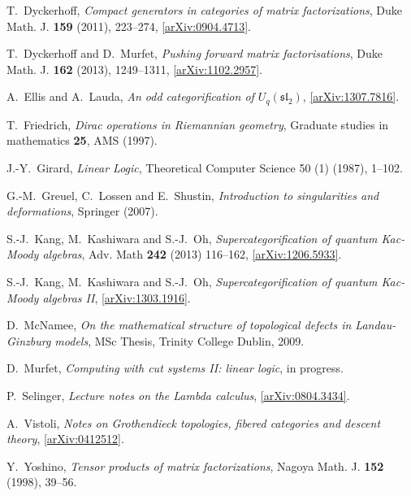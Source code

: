 \documentclass[english,letter paper,12pt,leqno]{article}
\theoremstyle{example}
\numberwithin{equation}{section}
\begin{document}
\begin{thebibliography}{BHLS03}
T.~Dyckerhoff, \textsl{Compact generators in categories of matrix factorizations},
  Duke Math. J. \textbf{159} (2011), 223--274,
  \href{http://arxiv.org/abs/0904.4713}{[arXiv:0904.4713]}.

T.~Dyckerhoff and D.~Murfet, \textsl{Pushing forward matrix factorisations}, Duke Math. J. \textbf{162} (2013), 1249--1311, \href{http://arxiv.org/abs/1102.2957}{[arXiv:1102.2957]}.

A.~Ellis and A.~Lauda, \textsl{An odd categorification of $U_q(\mathfrak{sl}_2)$}, \href{http://arxiv.org/abs/1307.7816}{[arXiv:1307.7816]}.

T.~Friedrich, \textsl{{D}irac operations in {R}iemannian geometry}, Graduate studies in mathematics \textbf{25}, AMS (1997).
  
J.-Y.~Girard, \textsl{Linear Logic}, Theoretical Computer Science 50 (1) (1987), 1--102.

G.-M.~Greuel, C.~Lossen and E.~Shustin, \textsl{Introduction to singularities and deformations}, Springer (2007).

S.-J.~Kang, M.~Kashiwara and S.-J.~Oh, \textsl{Supercategorification of quantum Kac-Moody algebras}, Adv. Math \textbf{242} (2013) 116--162, \href{http://arxiv.org/abs/1206.5933}{[arXiv:1206.5933]}.

S.-J.~Kang, M.~Kashiwara and S.-J.~Oh, \textsl{Supercategorification of quantum Kac-Moody algebras II}, \href{http://arxiv.org/abs/1303.1916}{[arXiv:1303.1916]}.

D.~McNamee, \textsl{On the mathematical structure of topological defects in
  {L}andau-{G}inzburg models}, MSc Thesis, Trinity College Dublin, 2009.
  
D.~Murfet, \textsl{Computing with cut systems II: linear logic}, in progress.

P.~Selinger, \textsl{Lecture notes on the {L}ambda calculus}, \href{http://arxiv.org/abs/0804.3434}{[arXiv:0804.3434]}.

A.~Vistoli, \textsl{Notes on {G}rothendieck topologies, fibered categories and descent theory}, \href{http://arxiv.org/abs/math/0412512}{[arXiv:0412512]}.

Y.~Yoshino, \textsl{Tensor products of matrix factorizations}, Nagoya Math. J.
  \textbf{152} (1998), 39--56.
  
\end{thebibliography}
\end{document}
